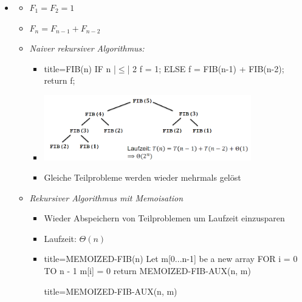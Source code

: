 \documentclass[
    12pt,
    a4paper,
    ngerman,
    color=3b,%
    marginpar=false,
    colorback=false,
    leqno,
]{tudaexercise}
\begin{document}
\begin{itemize}
        \item {}
            \begin{itemize}
                \item $F_1 = F_2 = 1$
                \item $F_n = F_{n-1} + F_{n-2}$
                \item \textit{Naiver rekursiver Algorithmus:}
                    \begin{itemize}
                        \item[]
                            \begin{ccode}[autogobble,escapeinside=||]{title={FIB(n)}}
                            IF n |$\leq$| 2
                                f = 1;
                            ELSE
                                f = FIB(n-1) + FIB(n-2);
                            return f;
                            \end{ccode}
                            \item[] \includegraphics[width=9cm]{pictures/fibBaum.PNG}
                            \item[] Gleiche Teilprobleme werden wieder mehrmals gelöst  
                    \end{itemize}
\pagebreak
                \item \textit{Rekursiver Algorithmus mit Memoisation}
                    \begin{itemize}
                        \item Wieder Abspeichern von Teilproblemen um Laufzeit einzusparen
                        \item Laufzeit: $\Theta(n)$
                        \item[]
                            \begin{ccode}[autogobble,escapeinside=||]{title={MEMOIZED-FIB(n)}}
                            Let m[0...n-1] be a new array
                            FOR i = 0 TO n - 1
                                m[i] = 0
                            return MEMOIZED-FIB-AUX(n, m)
                            \end{ccode}
                            \begin{ccode}[autogobble,escapeinside=||]{title={MEMOIZED-FIB-AUX(n, m)}}

\end{ccode}
\end{itemize}
\end{itemize}
\end{itemize}
\end{document}
